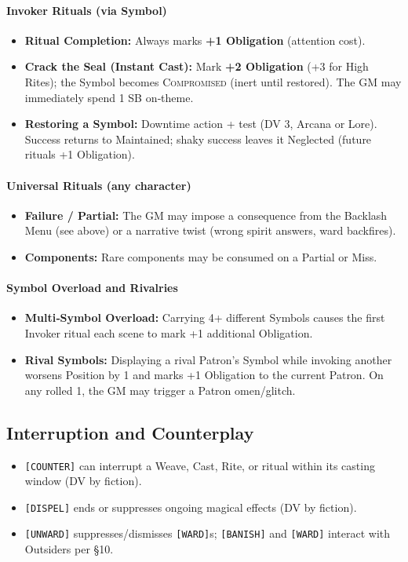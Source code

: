 \paragraph{Invoker Rituals (via Symbol)}
\begin{itemize}
  \item \textbf{Ritual Completion:} Always marks \textbf{+1 Obligation} (attention cost).
  \item \textbf{Crack the Seal (Instant Cast):} Mark \textbf{+2 Obligation} (+3 for High Rites); the Symbol becomes \textsc{Compromised} (inert until restored). The GM may immediately spend 1 SB on‑theme.
  \item \textbf{Restoring a Symbol:} Downtime action + test (DV 3, Arcana or Lore). Success returns to Maintained; shaky success leaves it Neglected (future rituals +1 Obligation).
\end{itemize}

\paragraph{Universal Rituals (any character)}
\begin{itemize}
  \item \textbf{Failure / Partial:} The GM may impose a consequence from the Backlash Menu (see above) or a narrative twist (wrong spirit answers, ward backfires).
  \item \textbf{Components:} Rare components may be consumed on a Partial or Miss.
\end{itemize}

\paragraph{Symbol Overload and Rivalries}
\begin{itemize}
  \item \textbf{Multi‑Symbol Overload:} Carrying 4+ different Symbols causes the first Invoker ritual each scene to mark +1 additional Obligation.
  \item \textbf{Rival Symbols:} Displaying a rival Patron's Symbol while invoking another worsens Position by 1 and marks +1 Obligation to the current Patron. On any rolled 1, the GM may trigger a Patron omen/glitch.
\end{itemize}

\subsection{Interruption and Counterplay}
\begin{itemize}
  \item \texttt{[COUNTER]} can interrupt a Weave, Cast, Rite, or ritual within its casting window (DV by fiction).
  \item \texttt{[DISPEL]} ends or suppresses ongoing magical effects (DV by fiction).
  \item \texttt{[UNWARD]} suppresses/dismisses \texttt{[WARD]}s; \texttt{[BANISH]} and \texttt{[WARD]} interact with Outsiders per §10.
\end{itemize}

